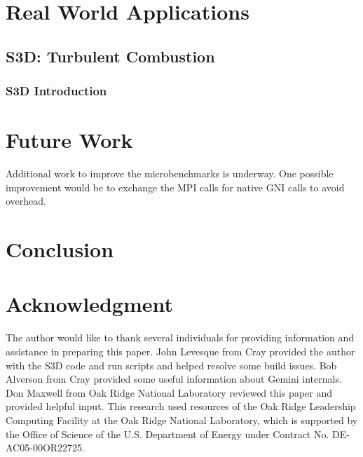 \documentclass[10pt, conference, compsocconf]{IEEEtran}
\begin{document}



\section{Real World Applications}

\subsection{S3D: Turbulent Combustion}

\subsubsection{S3D Introduction}



\section{Future Work}

Additional work to improve the microbenchmarks is underway.  One possible
improvement would be to exchange the MPI calls for native GNI calls to avoid
overhead.

\section{Conclusion}

\section*{Acknowledgment} The author would like to thank several individuals
for providing information and assistance in preparing this paper.  John
Levesque from Cray provided the author with the S3D code and run scripts and
helped resolve some build issues. Bob Alverson from Cray provided some useful
information about Gemini internals.  Don Maxwell from Oak Ridge National
Laboratory reviewed this paper and provided helpful input.  This research used
resources of the Oak Ridge Leadership Computing Facility at the Oak Ridge
National Laboratory, which is supported by the Office of Science of the U.S.
Department of Energy under Contract No. DE-AC05-00OR22725. 
\end{document}
